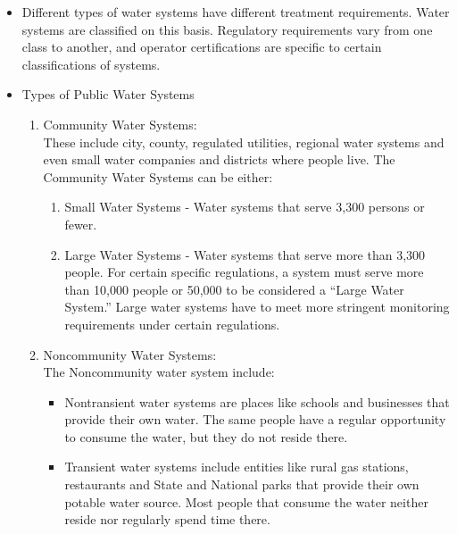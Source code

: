 \begin{itemize}
\begin{itemize}
\end{itemize}

\item Different types of water systems have different treatment requirements. Water systems are classified on this basis. Regulatory requirements vary from one class to another, and operator certifications are specific to certain classifications of systems.

\item Types of Public Water Systems
\begin{enumerate}
\item Community Water Systems:\\
These include city, county, regulated utilities, regional water systems and even small water companies and districts where people live.  The Community Water Systems can be either:
\begin{enumerate}
\item Small Water Systems - Water systems that serve 3,300 persons or fewer.
\item Large Water Systems - Water systems that serve more than 3,300 people.  For certain specific regulations, a system must serve more than 10,000 people or 50,000 to be considered a “Large Water System.”  Large water systems have to meet more stringent monitoring requirements under certain regulations.
\end{enumerate}

\item Noncommunity Water Systems:\\
The Noncommunity water system include:
\begin{itemize}
\item Nontransient water systems are places like schools and businesses that provide their own water. The same people have a regular opportunity to consume the water, but they do not reside there.

\item Transient water systems include entities like rural gas stations, restaurants and State and National parks that provide their own potable water source.  Most people that consume the water neither reside nor regularly spend time there.
\end{itemize}
\end{enumerate}

\end{itemize}


